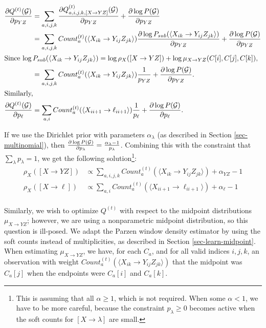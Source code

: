 \begin{align*}
\frac{\partial Q^{(t)}({\mathcal G})}{\partial p_{YZ}} &=
\sum_{a,i,j,k} \frac{\partial Q^{(t)}_{a,i,j,k,[X\to
    YZ]}({\mathcal G})}{\partial p_{YZ}} + \frac{\partial \log P({\mathcal G})}{\partial p_{YZ}} \\
&= 
\sum_{a,i,j,k} Count^{(t)}_a(\langle X_{ik} \to Y_{ij} Z_{jk} \rangle)
\frac{\partial \log P_{sub}(\langle X_{ik} \to
  Y_{ij}Z_{jk}\rangle)}{\partial p_{YZ}} + \frac{\partial
  \log P({\mathcal G})}{\partial p_{YZ}} \\
\intertext{Since $ \log P_{sub}(\langle X_{ik} \to
  Y_{ij}Z_{jk}\rangle) = \log \rho_X([X\to YZ]) + \log \mu_{X\to
    YZ}(C[i],C[j],C[k]),$ }
&= 
\sum_{a,i,j,k} Count^{(t)}_a(\langle X_{ik} \to Y_{ij} Z_{jk} \rangle)
\frac{1}{p_{YZ}} + \frac{\partial
  \log P({\mathcal G})}{\partial p_{YZ}}. \\
\intertext{Similarly,}
\frac{\partial Q^{(t)}({\mathcal G})}{\partial p_{\ell}} &=
\sum_{a,i} Count^{(t)}_a(\langle X_{i i+1} \to \ell_{i i+1} \rangle)
\frac{1}{p_{\ell}} + \frac{\partial
  \log P({\mathcal G})}{\partial p_{\ell}}. \\
\end{align*}



If we use the Dirichlet prior with parameters $\alpha_\lambda$ (as described in Section
\ref{sec-multinomial}), then $\frac{\partial \log P({\mathcal G})}{\partial
  p_{\lambda}} = \frac{\alpha_\lambda - 1}{p_\lambda}$. Combining this
with the constraint that $\sum_\lambda {p_\lambda}=1$, we get the
following solution\footnote{This is assuming that all $\alpha\ge 1$,
  which is not required. When some $\alpha < 1$, we have to be more
  careful, because the constraint $p_\lambda \ge 0$ becomes active
  when the soft counts for $[X\to \lambda]$ are small.}:
\begin{align*}
  \rho_{X}([X\to YZ]) &\propto \sum_{a,i,j,k} Count^{(t)}_a(\langle
  X_{ik} \to Y_{ij} Z_{jk} \rangle) + \alpha_{YZ} - 1\\
  \rho_{X}([X\to \ell]) &\propto \sum_{a,i} Count^{(t)}_a(\langle
  X_{i i+1} \to \ell_{i i+1} \rangle) + \alpha_{\ell} - 1\\
\end{align*}

Similarly, we wish to optimize $Q^{(t)}$ with respect to the midpoint
distributions $\mu_{X\to YZ}$; however, we are using a nonparametric
midpoint distribution, so this question is ill-posed. We adapt the
Parzen window density estimator by using the soft counts instead of
multiplicities, as described in Section \ref{sec-learn-midpoint}. When
estimating $\mu_{X\to YZ}$, we have, for each $C_a$, and for all valid
indices $i,j,k$, an observation with weight $Count_a^{(t)}(\langle
X_{ik} \to Y_{ij} Z_{jk}\rangle)$ that the midpoint was $C_a[j]$ when
the endpoints were $C_a[i]$ and $C_a[k]$.


